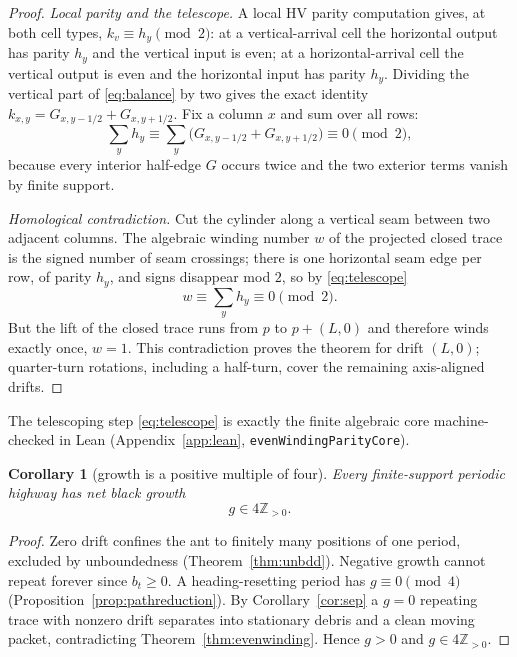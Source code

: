 \documentclass[11pt,reqno]{amsart}
\theoremstyle{plain}
\newtheorem{corollary}[theorem]{Corollary}
\theoremstyle{definition}
\newcommand{\Z}{\mathbb{Z}}
\newcommand{\growth}{g}
\begin{document}
\begin{proof}
\emph{Local parity and the telescope.} A local HV parity computation gives, at
both cell types, $k_v\equiv h_y\pmod2$: at a vertical-arrival cell the horizontal
output has parity $h_y$ and the vertical input is even; at a horizontal-arrival
cell the vertical output is even and the horizontal input has parity $h_y$.
Dividing the vertical part of \eqref{eq:balance} by two gives the exact identity
$k_{x,y}=G_{x,y-1/2}+G_{x,y+1/2}$. Fix a column $x$ and sum over all rows:
\begin{equation}\label{eq:telescope}
\sum_y h_y\equiv\sum_y\bigl(G_{x,y-1/2}+G_{x,y+1/2}\bigr)\equiv0\pmod2,
\end{equation}
because every interior half-edge $G$ occurs twice and the two exterior terms
vanish by finite support.

\emph{Homological contradiction.} Cut the cylinder along a vertical seam between
two adjacent columns. The algebraic winding number $w$ of the projected closed
trace is the signed number of seam crossings; there is one horizontal seam edge
per row, of parity $h_y$, and signs disappear mod $2$, so by \eqref{eq:telescope}
\[
w\equiv\sum_y h_y\equiv0\pmod2 .
\]
But the lift of the closed trace runs from $p$ to $p+(L,0)$ and therefore winds
exactly once, $w=1$. This contradiction proves the theorem for drift $(L,0)$;
quarter-turn rotations, including a half-turn, cover the remaining axis-aligned
drifts.
\end{proof}

The telescoping step \eqref{eq:telescope} is exactly the finite algebraic core
machine-checked in Lean (Appendix~\ref{app:lean},
\texttt{evenWindingParityCore}).

\begin{corollary}[growth is a positive multiple of four]\label{cor:growth4}
Every finite-support periodic highway has net black growth
\begin{equation}\label{eq:growth4}
\growth\in 4\Z_{>0}.
\end{equation}
\end{corollary}

\begin{proof}
Zero drift confines the ant to finitely many positions of one period, excluded by
unboundedness (Theorem~\ref{thm:unbdd}). Negative growth cannot repeat forever
since $b_t\ge0$. A heading-resetting period has $\growth\equiv0\pmod4$
(Proposition~\ref{prop:pathreduction}). By Corollary~\ref{cor:sep} a
$\growth=0$ repeating trace with nonzero drift separates into stationary debris
and a clean moving packet, contradicting Theorem~\ref{thm:evenwinding}. Hence
$\growth>0$ and $\growth\in4\Z_{>0}$.
\end{proof}
\end{document}

